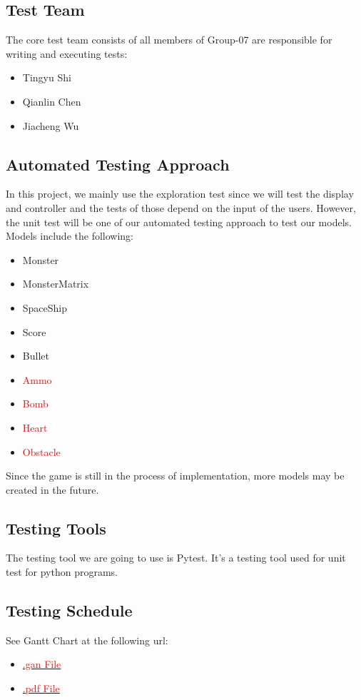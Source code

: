 \documentclass[12pt]{article}
\begin{document}
\subsection{Test Team}
The core test team consists of all members of Group-07 are responsible for writing and executing tests:
\begin{itemize}
\item Tingyu Shi
\item Qianlin Chen
\item Jiacheng Wu
\end{itemize}
\subsection{Automated Testing Approach}
In this project, we mainly use the exploration test since we will test the display and controller and the tests of those depend on the input of the users. However, the unit test will be one of our automated testing approach to test our models. Models include the following:
\begin{itemize}
\item Monster
\item MonsterMatrix
\item SpaceShip
\item Score
\item Bullet
\item \textcolor{red}{Ammo}
\item \textcolor{red}{Bomb}
\item \textcolor{red}{Heart}
\item \textcolor{red}{Obstacle}
\end{itemize}
Since the game is still in the process of implementation,
more models may be created in the future.
\subsection{Testing Tools}
The testing tool we are going to use is Pytest. It's a testing tool used for unit test for python programs.
\subsection{Testing Schedule}
		
See Gantt Chart at the following url:
\begin{itemize}
\item \href{https://gitlab.cas.mcmaster.ca/shit19/2022_winter_3xa3_l03_g07/-/blob/main/ProjectSchedule/Gantt_Project_TestPlan_Finished.gan}{\textcolor{red}{.gan File}}
\item \href{https://gitlab.cas.mcmaster.ca/shit19/2022_winter_3xa3_l03_g07/-/blob/main/ProjectSchedule/Gantt_Project_TestPlan_Finished.pdf}{\textcolor{red}{.pdf File}}
\end{itemize}
\end{document}

